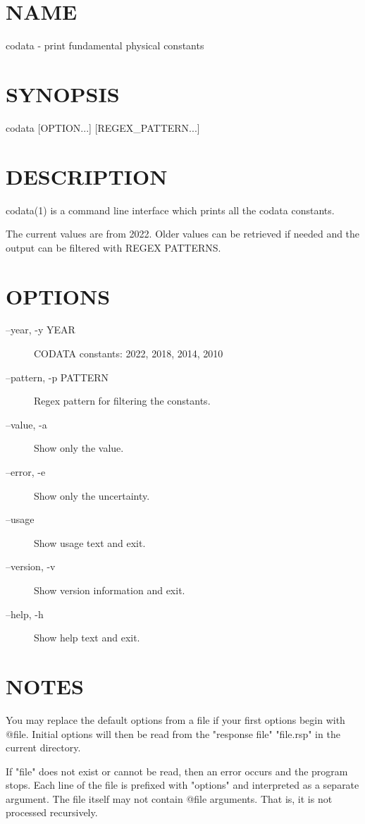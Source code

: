 \section*{NAME}
codata - print fundamental physical constants

\section*{SYNOPSIS}
{\ttfamily
codata [OPTION...] [REGEX\_PATTERN...]

}
\section*{DESCRIPTION}
codata(1) is a command line interface which prints all the codata
constants.

The current values are from 2022.
Older values can be retrieved if needed and
the output can be filtered with REGEX PATTERNS.


\section*{OPTIONS}
\begin{description}
\item[--year, -y YEAR] CODATA constants: 2022, 2018, 2014, 2010
\item[--pattern, -p PATTERN] Regex pattern for filtering the constants.
\item[--value, -a] Show only the value.
\item[--error, -e] Show only the uncertainty.
\item[--usage] Show usage text and exit.
\item[--version, -v] Show version information and exit.
\item[--help, -h] Show help text and exit.
\end{description}

\section*{NOTES}
You may replace the default options from a file if your first
options begin with @file.
Initial options will then be read from the "response file"
"file.rsp" in the current directory.

If "file" does not exist or cannot be read, then an error occurs and
the program stops. Each line of the file is prefixed with "options"
and interpreted as a separate argument. The file itself may not
contain @file arguments. That is, it is not processed recursively.

